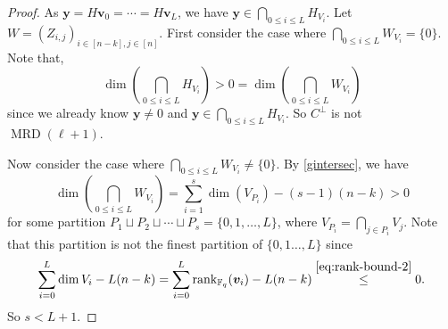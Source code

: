 \documentclass[11pt]{article}
\theoremstyle{plain}
\theoremstyle{definition}
\theoremstyle{remark}
\newcommand{\F}{\mathbb{F}}
\newcommand{\bv}{\bm{v}}
\newcommand{\bu}{\bm{u}}
\newcommand{\by}{\bm{y}}
\newcommand{\rank}{\mathrm{rank}}
\begin{document}
\begin{proof}

As $\by=H\bv_0=\cdots=H\bv_{L}$, we have $\by\in \bigcap_{0\leq i\leq L}H_{V_{i}}$.
Let $W=(Z_{i,j})_{i\in [n-k],j\in [n]}$.
First consider the case where $\bigcap_{0\leq i\leq L}W_{V_{i}}=\{0\}$.
Note that,
\[
\dim \left(\bigcap_{0\leq i\leq L}H_{V_{i}}\right)>0=\dim\left(\bigcap_{0\leq i\leq L}W_{V_{i}}\right)
\]
since we already know $\by\neq 0$ and $\by\in \bigcap_{0\leq i\leq L}H_{V_{i}}$.
So $C^{\perp}$ is not $\operatorname{MRD}(\ell+1)$.

Now consider the case where $\bigcap_{0\leq i\leq L}W_{V_{i}}\neq\{0\}$.
By \cref{gintersec}, we have
\begin{equation}\label{eq:intersect-h-v}
\dim\left(\bigcap_{0\leq i\leq L}W_{V_{i}}\right)=\sum_{i=1}^s \dim(V_{P_i})-(s-1)(n-k)>0
\end{equation}
for some partition  $P_1\sqcup P_2\sqcup\cdots\sqcup P_s=\{0,1,\ldots,L\}$, where $V_{P_i}=\bigcap_{j\in P_i} V_j$. Note that this partition is not the finest partition of $\{0,1\dots,L\}$ since 
\[
\sum_{i=0}^L \dim V_i-L(n-k)=\sum_{i=0}^L \rank_{\F_q}(\bv_i)-L(n-k)\stackrel{\eqref{eq:rank-bound-2}}{\leq} 0.
\]
So $s<L+1$.


\end{proof}
\end{document}
